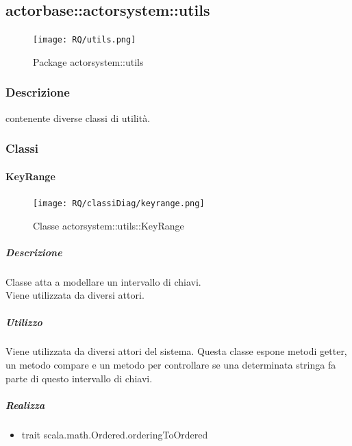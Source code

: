 \documentclass{scalatekids-article}
\begin{document}
\subsection{actorbase::actorsystem::utils}
\label{sec:actorbase::actorsystem::utils}

\begin{figure}[H]
   \begin{center}
     \texttt{[image: RQ/utils.png]}
     \caption{Package actorsystem::utils}
   \end{center}
 \end{figure}

\subsubsection{Descrizione}
 contenente diverse classi di utilità.

\subsubsection{Classi}


\paragraph{KeyRange}
\label{sec:actorbase::actorsystem::utils::KeyRange}

\begin{figure}[H]
   \begin{center}
     \texttt{[image: RQ/classiDiag/keyrange.png]}
     \caption{Classe actorsystem::utils::KeyRange}
   \end{center}
 \end{figure}

\subparagraph{Descrizione}
Classe atta a modellare un intervallo di chiavi.\\Viene utilizzata da diversi
attori.

\subparagraph{Utilizzo}
Viene utilizzata da diversi attori del sistema. Questa classe espone metodi
getter, un metodo compare e un metodo per controllare se una determinata
stringa fa parte di questo intervallo di chiavi.

\subparagraph{Realizza}
\begin{itemize}
\item trait scala.math.Ordered.orderingToOrdered
\end{itemize}
\end{document}
